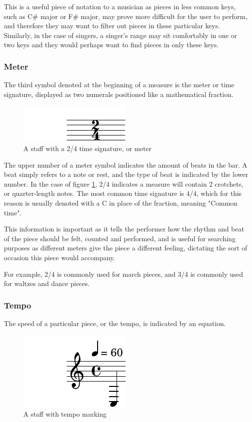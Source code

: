 This is a useful piece of notation to a musician as pieces in less common keys, such as C\# major or F\# major, may prove more difficult for the user to perform, and therefore they may want to filter out pieces in these particular keys. Similarly, in the case of singers, a singer's range may sit comfortably in one or two keys and they would perhaps want to find pieces in only these keys. 

\subsubsection{Meter}
The third symbol denoted at the beginning of a measure is the meter or time signature, displayed as two numerals positioned like a mathematical fraction.

\begin{figure}[h]
    \centering
        \includegraphics{meter-crop.pdf}
    \caption{A staff with a 2/4 time signature, or meter}
    \label{fig:meter}
\end{figure}

The upper number of a meter symbol indicates the amount of beats in the bar. A beat simply refers to a note or rest, and the type of beat is indicated by the lower number. In the case of figure \ref{fig:meter}, 2/4 indicates a measure will contain 2 crotchets, or quarter-length notes. The most common time signature is 4/4, which for this reason is usually denoted with a C in place of the fraction, meaning "Common time".

This information is important as it tells the performer how the rhythm and beat of the piece should be felt, counted and performed, and is useful for searching purposes as different meters give the piece a different feeling, dictating the sort of occasion this piece would accompany. 

For example, 2/4 is commonly used for march pieces, and 3/4 is commonly used for waltzes and dance pieces.

\subsubsection{Tempo}
The speed of a particular piece, or the tempo, is indicated by an equation.

\begin{figure}[h]
    \centering
        \includegraphics{tempo-crop.pdf}
    \caption{A staff with tempo marking}
    \label{fig:tempo}
\end{figure}


